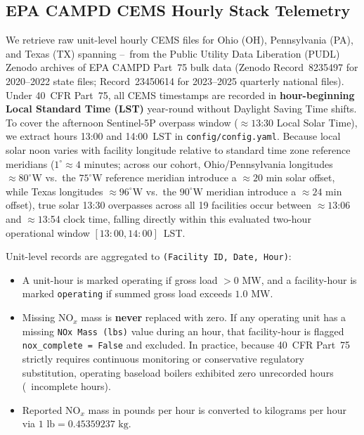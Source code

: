 \documentclass[conference]{IEEEtran}
\begin{document}
\subsection{EPA CAMPD CEMS Hourly Stack Telemetry}
We retrieve raw unit-level hourly CEMS files for Ohio (OH), Pennsylvania (PA), and Texas (TX) spanning \YearFirst--\YearLast~from the Public Utility Data Liberation (PUDL) Zenodo archives of EPA CAMPD Part~75 bulk data (Zenodo Record~8235497 for 2020--2022 state files; Record~23450614 for 2023--2025 quarterly national files). Under 40~CFR Part~75, all CEMS timestamps are recorded in \textbf{hour-beginning Local Standard Time (LST)} year-round without Daylight Saving Time shifts. To cover the afternoon Sentinel-5P overpass window ($\approx 13$:30 Local Solar Time), we extract hours 13:00 and 14:00~LST in \texttt{config/config.yaml}. Because local solar noon varies with facility longitude relative to standard time zone reference meridians ($1^\circ \approx 4\text{ minutes}$; across our cohort, Ohio/Pennsylvania longitudes $\approx 80^\circ\text{W}$ vs.\ the $75^\circ\text{W}$ reference meridian introduce a $\approx 20\text{ min}$ solar offset, while Texas longitudes $\approx 96^\circ\text{W}$ vs.\ the $90^\circ\text{W}$ meridian introduce a $\approx 24\text{ min}$ offset), true solar 13:30 overpasses across all 19 facilities occur between $\approx 13$:06 and $\approx 13$:54 clock time, falling directly within this evaluated two-hour operational window $[13:00, 14:00]$~LST.

Unit-level records are aggregated to \texttt{(Facility ID, Date, Hour)}:
\begin{itemize}
    \item A unit-hour is marked operating if gross load $> 0\text{ MW}$, and a facility-hour is marked \texttt{operating} if summed gross load exceeds $1.0\text{ MW}$.
    \item Missing $\text{NO}_x$ mass is \textbf{never} replaced with zero. If any operating unit has a missing \texttt{NOx Mass (lbs)} value during an hour, that facility-hour is flagged \texttt{nox\_complete = False} and excluded. In practice, because 40~CFR Part~75 strictly requires continuous monitoring or conservative regulatory substitution, operating baseload boilers exhibited zero unrecorded hours (\NMissingNOxHours~incomplete hours).
    \item Reported $\text{NO}_x$ mass in pounds per hour is converted to kilograms per hour via $1\text{ lb} = 0.45359237\text{ kg}$.
\end{itemize}
\end{document}
